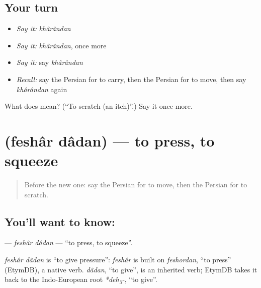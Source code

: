 \subsection*{Your turn}
\begin{itemize}
\raggedright
  \item \emph{Say it:} \emph{khârândan}
  \item \emph{Say it:} \emph{khârândan}, once more
  \item \emph{Say it:} say \emph{khârândan}
  \item \emph{Recall:} say the Persian for to carry, then the Persian for to move, then say \emph{khârândan} again
\end{itemize}

\begin{tcolorbox}[breakable,colback=teal!4,colframe=teal!35!black,title={Before you move on}]
What does  mean? (\textquotedblleft{}To scratch (an itch)\textquotedblright{}.) Say it once more.
\end{tcolorbox}
\section[\texorpdfstring{\fa{فشار} \fa{دادن} (feshâr dâdan)}{فشار دادن (feshâr dâdan)}]{  (feshâr dâdan) — to press, to squeeze}

\label{lesson:FA-C224-feshar-dadan}



\begin{quote}
Before the new one: say the Persian for to move, then the Persian for to scratch.
\end{quote}

\subsection*{You'll want to know:  }
\textbf{ } — \emph{feshâr dâdan} — \textquotedblleft{}to press, to squeeze\textquotedblright{}.

\begin{cousinweb}
\emph{feshâr dâdan} is \textquotedblleft{}to give pressure\textquotedblright{}: \emph{feshâr} is built on \emph{feshordan}, \textquotedblleft{}to press\textquotedblright{} (EtymDB), a native verb. \emph{dâdan}, \textquotedblleft{}to give\textquotedblright{}, is an inherited verb; EtymDB takes it back to the Indo-European root \emph{*deh\textsubscript{3}-}, \textquotedblleft{}to give\textquotedblright{}.
\end{cousinweb}

